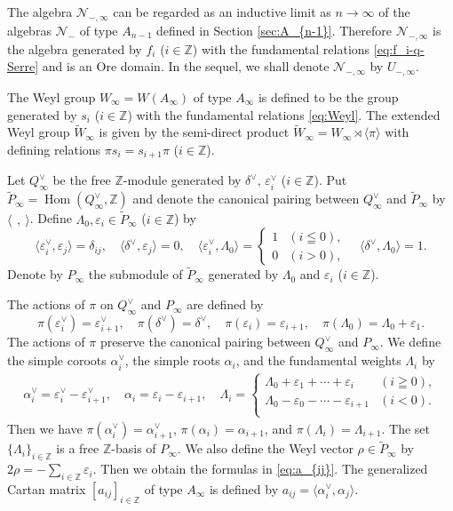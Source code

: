 \documentclass[12pt,twoside]{article}
\newcommand\N{{\mathcal N}}
\newcommand\tP{{\widetilde P}}
\newcommand\tW{{\widetilde W}}
\newcommand\av{\alpha^\vee}
\newcommand\eps{\varepsilon}
\newcommand\epsv{\eps^\vee}
\newcommand\deltav{\delta^\vee}
\newcommand\Qv{Q^\vee}
\newcommand\bra{\langle}
\newcommand\ket{\rangle}
\newcommand\Hom{\mathop{\mathrm{Hom}}\nolimits}
\newcommand\Z{{\mathbb Z}} %
\theoremstyle{plain} %
\theoremstyle{definition} %
\theoremstyle{definition} %
\numberwithin{theorem}{section}
\numberwithin{equation}{section}
\numberwithin{figure}{section}
\numberwithin{table}{section}
\newcommand\secref[1]{Section \ref{#1}}
\begin{document}
The algebra $\N_{-,\infty}$ can be regarded as an inductive limit 
as $n\to\infty$ of the algebras $\N_-$ of type $A_{n-1}$ 
defined in \secref{sec:A_{n-1}}.
Therefore $\N_{-,\infty}$ is the algebra generated by $f_i$ ($i\in\Z$)
with the fundamental relations \eqref{eq:f_i-q-Serre}
and is an Ore domain.
In the sequel, we shall denote $\N_{-,\infty}$ by $U_{-,\infty}$.

The Weyl group $W_\infty=W(A_\infty)$ of type $A_\infty$ 
is defined to be the group generated by $s_i$ ($i\in\Z$) 
with the fundamental relations \eqref{eq:Weyl}.
The extended Weyl group $\tW_\infty$ is given by
the semi-direct product $\tW_\infty=W_\infty\rtimes\bra\pi\ket$ with
defining relations $\pi s_i = s_{i+1}\pi$ ($i\in\Z$).

Let $\Qv_\infty$ be the free $\Z$-module generated 
by $\deltav$, $\epsv_i$ ($i\in\Z$).
Put $\tP_\infty=\Hom(\Qv_\infty,\Z)$
and denote the canonical pairing 
between $\Qv_\infty$ and $\tP_\infty$ by $\bra\,\ ,\ \ket$.
Define $\Lambda_0,\eps_i\in\tP_\infty$ ($i\in\Z$) by
\begin{equation*}
 \bra\epsv_i,\eps_j\ket = \delta_{ij}, \quad
 \bra\deltav,\eps_j\ket = 0, \quad
 \bra\epsv_i,\Lambda_0\ket = 
 \begin{cases}
  1 & (i\leqq 0), \\
  0 & (i>0),
 \end{cases}
 \quad
 \bra\deltav,\Lambda_0\ket = 1.
\end{equation*}
Denote by $P_\infty$ the submodule of $\tP_\infty$ 
generated by $\Lambda_0$ and $\eps_i$ ($i\in\Z$).

The actions of $\pi$ on $\Qv_\infty$ and $P_\infty$ are defined by
\begin{equation*}
 \pi(\epsv_i) = \epsv_{i+1}, \quad
 \pi(\deltav) = \deltav, \quad
 \pi(\eps_i) = \eps_{i+1}, \quad
 \pi(\Lambda_0) = \Lambda_0+\eps_1.
\end{equation*}
The actions of $\pi$ preserve the canonical pairing
between $\Qv_\infty$ and $P_\infty$.
We define the simple coroots $\av_i$, 
the simple roots $\alpha_i$, 
and the fundamental weights $\Lambda_i$ by 
\begin{align*}
 \av_i = \epsv_i-\epsv_{i+1}, \quad
 \alpha_i = \eps_i - \eps_{i+1},
 \quad
 \Lambda_i = 
 \begin{cases}
  \Lambda_0 + \eps_1 + \cdots + \eps_i     & (i\geqq 0), \\
  \Lambda_0 - \eps_0 - \cdots - \eps_{i+1} & (i<0). \\
 \end{cases}
\end{align*}
Then we have $\pi(\av_i)=\av_{i+1}$, $\pi(\alpha_i)=\alpha_{i+1}$,
and $\pi(\Lambda_i)=\Lambda_{i+1}$.
The set $\{\Lambda_i\}_{i\in\Z}$ is a free $\Z$-basis of $P_\infty$.
We also define the Weyl vector $\rho\in\tP_\infty$ 
by $2\rho = - \sum_{i\in\Z}\eps_i$.
Then we obtain the formulas in \eqref{eq:a_{ij}}.
The generalized Cartan matrix $[a_{ij}]_{i\in\Z}$ of type $A_\infty$
is defined by $a_{ij}=\bra\av_i,\alpha_j\ket$.
\end{document}
